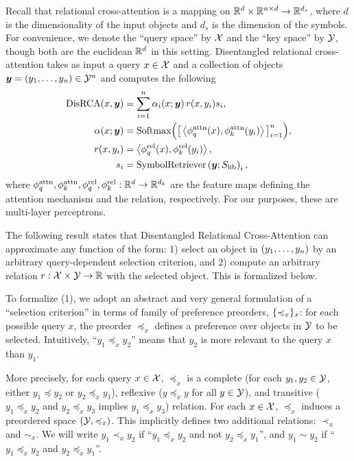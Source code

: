 \documentclass{article}
\begin{document}
Recall that relational cross-attention is a mapping on $\mathbb{R}^d \times \mathbb{R}^{n \times d} \to \mathbb{R}^{d_s}$, where $d$ is the dimensionality of the input objects and $d_s$ is the dimension of the symbols. For convenience, we denote the ``query space'' by ${\mathcal{X}}$ and the ``key space'' by ${\mathcal{Y}}$, though both are the euclidean $\mathbb{R}^d$ in this setting. Disentangled relational cross-attention takes as input a query $x \in {\mathcal{X}}$ and a collection of objects $\bm{y} = (y_1, \ldots, y_n) \in {\mathcal{Y}}^n$ and computes the following
\begin{align}
  \mathrm{DisRCA}(x, \bm{y}) &= \sum_{i=1}^{n} \alpha_i(x; \bm{y}) \, r(x, y_i) s_i, \\
  \alpha(x; \bm{y}) &= \mathrm{Softmax}\Big(\big[\left \langle \phi_q^{\mathrm{attn}}(x), \phi_k^{\mathrm{attn}}(y_i) \right\rangle\big]_{i=1}^{n}\Big), \\
  r(x, y_i) &= \left \langle \phi_q^{\mathrm{rel}}(x), \phi_k^{\mathrm{rel}}(y_i) \right\rangle, \\
  s_i &= \mathrm{SymbolRetriever}\left(\bm{y}; S_\mathrm{lib}\right)_i,
\end{align}
where $\phi_q^{\mathrm{attn}}, \phi_k^{\mathrm{attn}}, \phi_q^{\mathrm{rel}}, \phi_k^{\mathrm{rel}}: \mathbb{R}^{d} \to \mathbb{R}^{d_k}$ are the feature maps defining the attention mechanism and the relation, respectively. For our purposes, these are multi-layer perceptrons.

The following result states that Disentangled Relational Cross-Attention can approximate any function of the form: 1) select an object in $(y_1, \ldots, y_n)$ by an arbitrary query-dependent selection criterion, and 2) compute an arbitrary relation $r: {\mathcal{X}} \times {\mathcal{Y}} \to \mathbb{R}$ with the selected object. This is formalized below.

To formalize (1), we adopt an abstract and very general formulation of a ``selection criterion'' in terms of family of preference preorders, $\{\preccurlyeq_x\}_x$: for each possible query $x$, the preorder $\preceq_x$ defines a preference over objects in ${\mathcal{Y}}$ to be selected. Intuitively, ``$y_1 \preceq_x y_2$'' means that $y_2$ is more relevant to the query $x$ than $y_1$.

More precisely, for each query $x \in {\mathcal{X}}$, $\preceq_x$ is a complete (for each $y_1, y_2 \in {\mathcal{Y}}$, either $y_1 \preceq y_2$ or $y_2 \preceq_x y_1$), reflexive ($y \preceq_x y$ for all $y \in {\mathcal{Y}}$), and transitive ($y_1 \preceq_x y_2$ and $y_2 \preceq_x y_3$ implies $y_1 \preceq_x y_3$) relation. For each $x \in {\mathcal{X}}$, $\preceq_x$ induces a preordered space $({\mathcal{Y}}, \preccurlyeq_x)$. This implicitly defines two additional relations: $\prec_x$ and $\sim_x$. We will write $y_1 \prec_x y_2$ if ``$y_1 \preceq_x y_2$ and not $y_2 \preceq_x y_1$'', and $y_1 \sim y_2$ if ``$y_1 \preceq_x y_2$ and $y_2 \preceq_x y_1$''.
\end{document}
